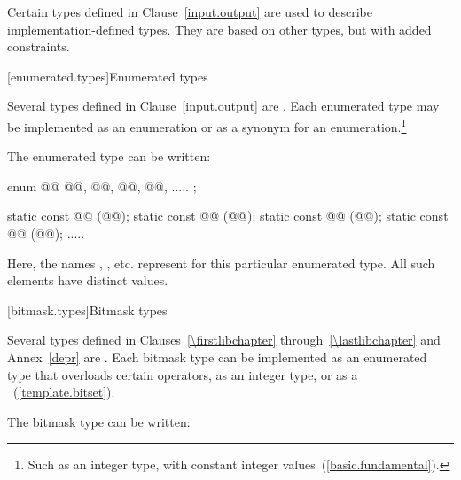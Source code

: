 \pnum
Certain types defined in Clause~\ref{input.output} are used to describe implementation-defined types.
%
They are based on other types, but with added constraints.

[enumerated.types]{Enumerated types}

\pnum
Several types defined in Clause~\ref{input.output} are
.
%
Each enumerated type may be implemented as an enumeration or as a synonym for
an enumeration.\footnote{Such as an integer type, with constant integer
values~(\ref{basic.fundamental}).}

\pnum
The enumerated type  can be written:

\begin{codeblock}
enum @@ { @@, @@, @@, @@, ..... };

static const @@ (@@);
static const @@ (@@);
static const @@ (@@);
static const @@ (@@);
  .....
\end{codeblock}

\pnum
Here, the names , , etc. represent
for this particular enumerated type.
%
All such elements have distinct values.

[bitmask.types]{Bitmask types}

\pnum
Several types defined in Clauses~\ref{\firstlibchapter} through~\ref{\lastlibchapter}
and Annex~\ref{depr} are
.
%
Each bitmask type can be implemented as an
enumerated type that overloads certain operators, as an integer type,
or as a
~(\ref{template.bitset}).
%

\pnum
The bitmask type  can be written:


